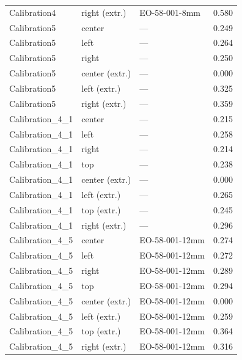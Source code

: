 \begin{table}[H]
\begin{tabularx}{\textwidth}{@{}Xllr@{}}
    Calibration4 & right (extr.) & EO-58-001-8mm & 0.580 \\
    Calibration5 & center & --- & 0.249 \\
    Calibration5 & left & --- & 0.264 \\
    Calibration5 & right & --- & 0.250 \\
    Calibration5 & center (extr.) & --- & 0.000 \\
    Calibration5 & left (extr.) & --- & 0.325 \\
    Calibration5 & right (extr.) & --- & 0.359 \\
    Calibration\_4\_1 & center & --- & 0.215 \\
    Calibration\_4\_1 & left & --- & 0.258 \\
    Calibration\_4\_1 & right & --- & 0.214 \\
    Calibration\_4\_1 & top & --- & 0.238 \\
    Calibration\_4\_1 & center (extr.) & --- & 0.000 \\
    Calibration\_4\_1 & left (extr.) & --- & 0.265 \\
    Calibration\_4\_1 & top (extr.) & --- & 0.245 \\
    Calibration\_4\_1 & right (extr.) & --- & 0.296 \\
    Calibration\_4\_5 & center & EO-58-001-12mm & 0.274 \\
    Calibration\_4\_5 & left & EO-58-001-12mm & 0.272 \\
    Calibration\_4\_5 & right & EO-58-001-12mm & 0.289 \\
    Calibration\_4\_5 & top & EO-58-001-12mm & 0.294 \\
    Calibration\_4\_5 & center (extr.) & EO-58-001-12mm & 0.000 \\
    Calibration\_4\_5 & left (extr.) & EO-58-001-12mm & 0.259 \\
    Calibration\_4\_5 & top (extr.) & EO-58-001-12mm & 0.364 \\
    Calibration\_4\_5 & right (extr.) & EO-58-001-12mm & 0.316 \\
    \bottomrule
  \end{tabularx}
\end{table}

